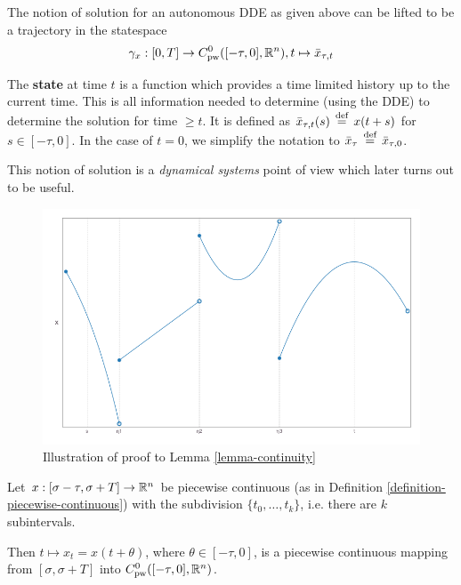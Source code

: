 \documentclass[10pt]{article}
\begin{document}
The notion of solution for an autonomous DDE as given above can be lifted to be a trajectory in the statespace
\begin{equation}
    \gamma_x:[0,T]\rightarrow C^0_\text{pw}([-\tau,0],\mathbb{R}^n),\\ t\mapsto\bar{x}_{\tau,t}
\end{equation}

The \textbf{state} at time $t$ is a function which provides a time limited history up to the current time. This is all information needed to determine (using the DDE) to determine the solution for time $\geq t$. It is defined as $\bar{x}_{\tau,t}(s)\,\stackrel{\text{def}}{=}\, x(t+s)$ for $s\in [-\tau,0]$. In the case of $t=0$, we simplify the notation to $\bar{x}_{\tau} \,\stackrel{\text{def}}{=}\, \bar{x}_{\tau,0}$.

This notion of solution is a \emph{dynamical systems} point of view which later turns out to be useful.

\begin{figure}[h]\centering
    \includegraphics[width=\textwidth]{multiple.png}
	\caption{Illustration of proof to Lemma \ref{lemma-continuity}}
	\label{fig:not-allowed}
\end{figure}

\begin{lemma}
    \label{lemma-continuity}

    Let $x:[\sigma-\tau,\sigma+T] \rightarrow \mathbb{R}^n$ be piecewise continuous (as in Definition \ref{definition-piecewise-continuous}) with the subdivision $\{t_0,\ldots,t_k\}$, i.e. there are $k$ subintervals.

    Then $t \mapsto x_t = x(t+\theta)$, where $\theta\in[-\tau,0]$, is a piecewise continuous mapping from $[\sigma,\sigma+T]$ into $C^0_\text{pw}([-\tau,0],\mathbb{R}^n)$.
\end{lemma}
\end{document}
